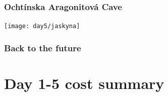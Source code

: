 \documentclass{beamer}
\begin{document}
	\begin{frame}
		\frametitle{Ochtínska Aragonitová Cave}
		\texttt{[image: day5/jaskyna]}
	\end{frame}

	\begin{frame}
		\frametitle{Back to the future}

	\end{frame}

	\section{Day 1-5 cost summary}
\end{document}
